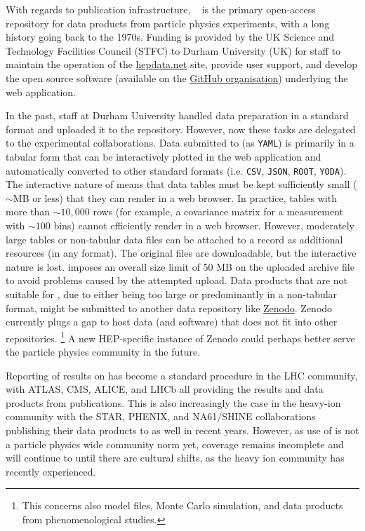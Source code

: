 \documentclass[11pt]{article}
\begin{document}
With regards to publication infrastructure, 
\hepdata~\cite{hepdata} is the primary open-access repository for %
data products from particle physics experiments, with a long history going back to the 1970s.
Funding is provided by the UK Science and Technology Facilities Council (STFC) to Durham University (UK) for staff to maintain the operation of the \href{https://www.hepdata.net/}{hepdata.net} site, provide user support, and develop the open source software (available on the \href{https://github.com/HEPData}{\hepdata GitHub organisation}) underlying the web application.

In the past, \hepdata staff at Durham University handled data preparation in a standard format and uploaded it to the repository.
However, now these tasks are delegated to the experimental collaborations.
Data submitted to \hepdata (as \texttt{YAML}) is primarily in a tabular form that can be interactively plotted in the web application and automatically converted to other standard formats (i.e. \texttt{CSV}, \texttt{JSON}, \texttt{ROOT}, \texttt{YODA}).
The interactive nature of \hepdata means that data tables must be kept sufficiently small ($\sim$MB or less) that they can render in a web browser.
In practice, tables with more than $\sim 10,000$ rows (for example, a covariance matrix for a measurement with $\sim 100$ bins) cannot efficiently render in a web browser.
However, moderately large tables or non-tabular data files can be attached to a \hepdata record as additional resources (in any format).
The original files are downloadable, but the interactive nature is lost.
\hepdata imposes an overall size limit of 50 MB on the uploaded archive file to avoid problems caused by the attempted upload. 
%
Data products that are not suitable for \hepdata, due to either being too large or predominantly in a non-tabular format, might be submitted to another data repository like \href{https://zenodo.org/}{Zenodo}.
Zenodo currently plugs a gap to host data (and software) that does not fit into other repositories.%
\footnote{This concerns also model files, Monte Carlo simulation, and data products from phenomenological studies.}
A new \gls{HEP}-specific instance of Zenodo could perhaps better serve the particle physics community in the future.


Reporting of results on \hepdata has become a standard procedure in the \gls{LHC} community, with \gls{ATLAS}, \gls{CMS}, \gls{ALICE}, and \gls{LHCb} all providing the results and data products from publications.
This is also increasingly the case in the heavy-ion community with the \gls{STAR}, \gls{PHENIX}, and NA61/SHINE collaborations publishing their data products to \hepdata as well in recent years.
However, as use of \hepdata is not a particle physics wide community norm yet, coverage remains incomplete and will continue to until there are cultural shifts, as the heavy ion community has recently experienced.
\end{document}

